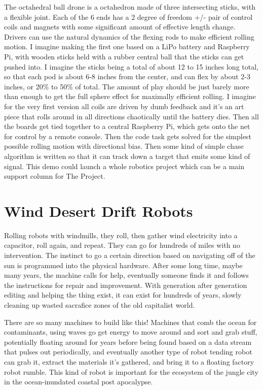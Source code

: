 The octahedral ball drone is a octahedron made of three intersecting
sticks, with a flexible joint. Each of the 6 ends has a 2 degree of
freedom +/- pair of control coils and magnets with some significant
amount of effective length change. Drivers can use the natural dynamics
of the flexing rods to make efficient rolling motion. I imagine making
the first one based on a LiPo battery and Raspberry Pi, with wooden
sticks held with a rubber central ball that the sticks can get pushed
into. I imagine the sticks being a total of about 12 to 15 inches long
total, so that each pod is about 6-8 inches from the center, and can
flex by about 2-3 inches, or 20\% to 50\% of total. The amount of play
should be just barely more than enough to get the full sphere effect for
maximally efficient rolling. I imagine for the very first version all
coils are driven by dumb feedback and it's an art piece that rolls
around in all directions chaotically until the battery dies. Then all
the boards get tied together to a central Raspberry Pi, which gets onto
the net for control by a remote console. Then the code task gets solved
for the simplest possible rolling motion with directional bias. Then
some kind of simple chase algorithm is written so that it can track down
a target that emits some kind of signal. This demo could launch a whole
robotics project which can be a main support column for The Project.

\section{Wind Desert Drift Robots}\label{wind-desert-drift-robots}

Rolling robots with windmills, they roll, then gather wind electricity
into a capacitor, roll again, and repeat. They can go for hundreds of
miles with no intervention. The instinct to go a certain direction based
on navigating off of the sun is programmed into the physical hardware.
After some long time, maybe many years, the machine calls for help,
eventually someone finds it and follows the instructions for repair and
improvement. With generation after generation editing and helping the
thing exist, it can exist for hundreds of years, slowly cleaning up
wasted sacrafice zones of the old capitalist world.

There are so many machines to build like this! Machines that comb the
ocean for contaminants, using waves go get energy to move around and
sort and grab stuff, potentially floating around for years before being
found based on a data stream that pulses out periodically, and
eventually another type of robot tending robot can grab it, extract the
materials it's gathered, and bring it to a floating factory robot
rumble. This kind of robot is important for the ecosystem of the jungle
city in the ocean-inundated coastal post apocalypse.

